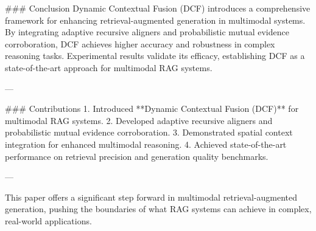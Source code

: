 ### Conclusion
Dynamic Contextual Fusion (DCF) introduces a comprehensive framework for enhancing retrieval-augmented generation in multimodal systems. By integrating adaptive recursive aligners and probabilistic mutual evidence corroboration, DCF achieves higher accuracy and robustness in complex reasoning tasks. Experimental results validate its efficacy, establishing DCF as a state-of-the-art approach for multimodal RAG systems.

---

### Contributions
1. Introduced **Dynamic Contextual Fusion (DCF)** for multimodal RAG systems.
2. Developed adaptive recursive aligners and probabilistic mutual evidence corroboration.
3. Demonstrated spatial context integration for enhanced multimodal reasoning.
4. Achieved state-of-the-art performance on retrieval precision and generation quality benchmarks.

--- 

This paper offers a significant step forward in multimodal retrieval-augmented generation, pushing the boundaries of what RAG systems can achieve in complex, real-world applications.